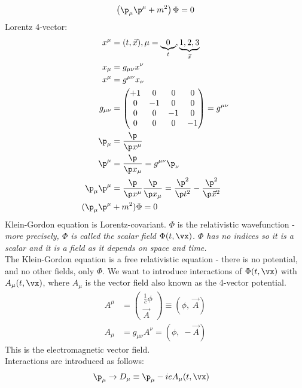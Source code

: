 \documentclass[a4paper, 11pt, normalem]{report}
\begin{document}
\chapter{}
\begin{equation}
    \left(\p_\mu\p^\mu + m^2\right)\Phi = 0
\end{equation}
Lorentz 4-vector:
\begin{align}
    x^\mu &= (t,\vec{x}), \mu = \underbrace{0}_{t},\underbrace{1,2,3}_{\vec{x}} \\
    x_\mu &= g_{\mu\nu}x^\nu \\
    x^\mu &= g^{\mu\nu}x_\nu \\
    g_{\mu\nu} &= \begin{pmatrix} +1 & 0 & 0 & 0 \\ 0 & -1 & 0 & 0 \\ 0 & 0 & -1 & 0 \\ 0 & 0 & 0 & -1 \end{pmatrix} = g^{\mu\nu} \\
    \p_\mu &= \frac{\p}{\p x^\mu} \\
    \p^\mu &= \frac{\p}{\p x_\mu} = g^{\mu\nu}\p_\nu \\
    \p_\mu\p^\mu &= \frac{\p}{\p x^\mu}\frac{\p}{\p x_\mu} = \frac{\p^2}{\p t^2} - \frac{\p^2}{\p\vec{x}^2} \\
    (\p_\mu\p^\mu &+ m^2)\Phi = 0
\end{align}
Klein-Gordon equation is Lorentz-covariant.
$\Phi$ is the relativistic wavefunction - \textit{more precisely, $\Phi$ is called the scalar field $\Phi(t,\vx)$. $\Phi$ has no indices so it is a scalar and it is a field as it depends on space and time.} \\
The Klein-Gordon equation is a free relativistic equation - there is no potential, and no other fields, only $\Phi$.
We want to introduce interactions of $\Phi(t,\vx)$ with $A_\mu(t,\vx)$, where $A_\mu$ is the vector field also known as the 4-vector potential.
\begin{align}
    A^\mu &= \begin{pmatrix} \frac{1}{c}\phi \\ \vec{A} \end{pmatrix} \equiv (\phi,\; \vec{A}) \\
    A_\mu &= g_{\mu\nu}A^\nu = (\phi,\;-\vec{A})
\end{align}
This is the electromagnetic vector field. \\
Interactions are introduced as follows:
\begin{align}
    \p_\mu \to D_\mu &\equiv \p_\mu - ieA_\mu(t,\vx)
\end{align}
\end{document}
